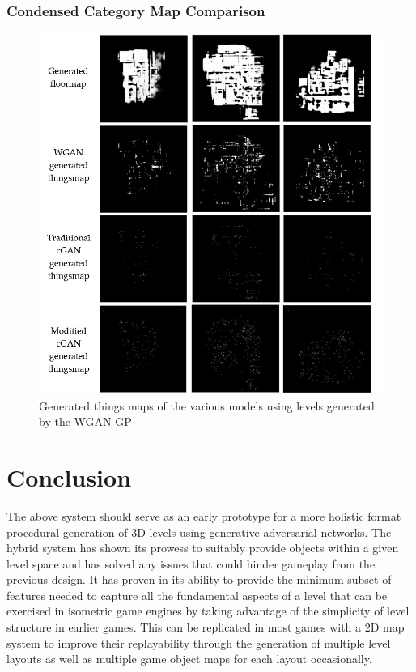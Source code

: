 \documentclass{Configuration_Files/PoliMi3i_thesis}
\begin{document}
\subsection{Condensed Category Map Comparison}
\begin{figure}[H]
    \centering
    \includegraphics[width=1\textwidth]{sample_comparison.jpg}
    \caption[Generated things maps comparision]{ Generated things maps of the various models using levels generated by 
the WGAN-GP}
    \label{fig:samplecomparison}
\end{figure}

\chapter{Conclusion}
\label{ch:conclusion}%
The above system should serve as an early prototype for a more holistic format 
procedural generation of 3D levels using generative adversarial networks. The 
hybrid system has shown its prowess to suitably provide objects within a given level 
space and has solved any issues that could hinder gameplay from the previous 
design. It has proven in its ability to provide the minimum subset of features needed 
to capture all the fundamental aspects of a level that can be exercised in isometric 
game engines by taking advantage of the simplicity of level structure in earlier 
games. This can be replicated in most games with a 2D map system to improve their 
replayability through the generation of multiple level layouts as well as multiple 
game object maps for each layout occasionally.
\end{document}
